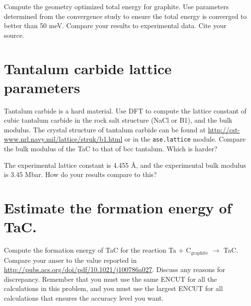 \documentclass[11pt]{article}
\begin{document}
Compute the geometry optimized total energy for graphite. Use parameters determined from the convergence study to ensure the total energy is converged to better than 50 meV. Compare your results to experimental data. Cite your source.
\section{Tantalum carbide lattice parameters}
\label{sec-6}

Tantalum carbide is a hard material. Use DFT to compute the lattice constant of cubic tantalum carbide in the rock salt structure (NaCl or B1), and the bulk modulus. The crystal structure of tantalum carbide can be found at \href{http://cst-www.nrl.navy.mil/lattice/struk/b1.html}{http://cst-www.nrl.navy.mil/lattice/struk/b1.html} or in the \texttt{ase.lattice} module. Compare the bulk modulus of the TaC to that of bcc tantalum. Which is harder?

The experimental lattice constant is 4.455 \AA{}, and the experimental bulk modulus is 3.45 Mbar. How do your results compare to this?
\section{Estimate the formation energy of TaC.}
\label{sec-7}

Compute the formation energy of TaC for the reaction Ta + C$_{\mathrm{graphite}}$ $\rightarrow$ TaC. Compare your anser to the value reported in \href{http://pubs.acs.org/doi/pdf/10.1021/j100786a027}{http://pubs.acs.org/doi/pdf/10.1021/j100786a027}. Discuss any reasons for discrepancy. Remember that you must use the same ENCUT for all the calculations in this problem, and you must use the largest ENCUT for all calculations that ensures the accuracy level you want.
\end{document}
